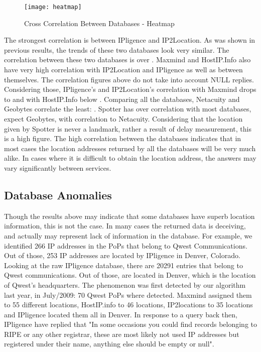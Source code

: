 \begin{figure}
\begin{minipage}[b]{\linewidth}
\centering
\texttt{[image: heatmap]}
\caption{Cross Correlation Between Databases - Heatmap}
\label{fig:heatmap}
\end{minipage}
\end{figure}


The strongest correlation is between IPligence and IP2Location. As
was shown in previous results, the trends of these two databases
look very similar. The correlation between these two databases is
over . Maxmind and HostIP.Info also have very high correlation
with IP2Location and IPligence as well as between themselves. The
correlation figures above do not take into account NULL replies.
Considering those, IPligence's and IP2Location's correlation with
Maxmind drops to  and with HostIP.Info below . Comparing
all the databases, Netacuity and Geobytes correlate the least:
. Spotter has over  correlation with most databases,
expect Geobytes, with  correlation to Netacuity. Considering
that the location given by Spotter is never a landmark, rather a
result of delay measurement, this is a high figure. The high
correlation between the databases indicates that in most cases the
location addresses returned by all the databases will be very much
alike. In cases where it is difficult to obtain the location
address, the answers may vary significantly between services.

\subsection{Database Anomalies}
Though the results above may indicate that some databases have
superb location information, this is not the case. In many cases the
returned data is deceiving, and actually may represent lack of
information in the database. For example, we identified 266 IP
addresses in the PoPs that belong to Qwest Communications. Out of
those, 253 IP addresses are located by IPligence in Denver,
Colorado. Looking at the raw IPligence database, there are 20291
entries that belong to Qwest communications. Out of those, 
are located in Denver, which is the location of Qwest's
headquarters. The phenomenon was first detected by our algorithm
last year, in July/2009: 70 Qwest PoPs where detected. Maxmind
assigned them to 55 different locations, HostIP.info to 46
locations, IP2locations to 35 locations and IPligence located them
all in Denver. In response to a query back then, IPligence have
replied that "In some occasions you could find records belonging to
RIPE or any other registrar, these are most likely not used IP
addresses but registered under their name, anything else should be
empty or null".


